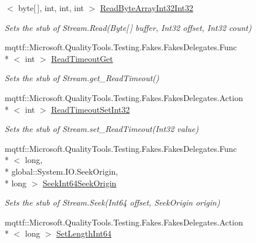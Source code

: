 \begin{DoxyCompactItemize}
$<$ byte\mbox{[}$\,$\mbox{]}, int, int, int $>$ \hyperlink{class_system_1_1_net_1_1_security_1_1_fakes_1_1_stub_authenticated_stream_aa1cf02847870291177d19b4a1a46ab6a}{Read\-Byte\-Array\-Int32\-Int32}
\begin{DoxyCompactList}\small\item\em Sets the stub of Stream.\-Read(\-Byte\mbox{[}$\,$\mbox{]} buffer, Int32 offset, Int32 count)\end{DoxyCompactList}\item 
mqttf\-::\-Microsoft.\-Quality\-Tools.\-Testing.\-Fakes.\-Fakes\-Delegates.\-Func\\*
$<$ int $>$ \hyperlink{class_system_1_1_net_1_1_security_1_1_fakes_1_1_stub_authenticated_stream_a0faf0029c2aaa0aaca8c60085736de43}{Read\-Timeout\-Get}
\begin{DoxyCompactList}\small\item\em Sets the stub of Stream.\-get\-\_\-\-Read\-Timeout()\end{DoxyCompactList}\item 
mqttf\-::\-Microsoft.\-Quality\-Tools.\-Testing.\-Fakes.\-Fakes\-Delegates.\-Action\\*
$<$ int $>$ \hyperlink{class_system_1_1_net_1_1_security_1_1_fakes_1_1_stub_authenticated_stream_a56c54f4c4c390fad8736f26d44d64721}{Read\-Timeout\-Set\-Int32}
\begin{DoxyCompactList}\small\item\em Sets the stub of Stream.\-set\-\_\-\-Read\-Timeout(\-Int32 value)\end{DoxyCompactList}\item 
mqttf\-::\-Microsoft.\-Quality\-Tools.\-Testing.\-Fakes.\-Fakes\-Delegates.\-Func\\*
$<$ long, \\*
global\-::\-System.\-I\-O.\-Seek\-Origin, \\*
long $>$ \hyperlink{class_system_1_1_net_1_1_security_1_1_fakes_1_1_stub_authenticated_stream_ace093a958aac9a94f9e23ce8bb3039b4}{Seek\-Int64\-Seek\-Origin}
\begin{DoxyCompactList}\small\item\em Sets the stub of Stream.\-Seek(\-Int64 offset, Seek\-Origin origin)\end{DoxyCompactList}\item 
mqttf\-::\-Microsoft.\-Quality\-Tools.\-Testing.\-Fakes.\-Fakes\-Delegates.\-Action\\*
$<$ long $>$ \hyperlink{class_system_1_1_net_1_1_security_1_1_fakes_1_1_stub_authenticated_stream_a3ac2ce26b48166ebaa09bfba68444876}{Set\-Length\-Int64}

\end{DoxyCompactItemize}
